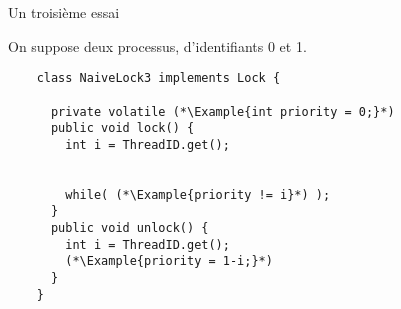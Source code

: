 
\begingroup

\begin{frame}[fragile]{Un troisième essai}

  \vspace{-15mm}
  On suppose deux processus, d'identifiants 0 et 1. 

  \begin{lstlisting}
    class NaiveLock3 implements Lock {

      private volatile (*\Example{int priority = 0;}*)
      public void lock() {
        int i = ThreadID.get();

        
        while( (*\Example{priority != i}*) );
      }
      public void unlock() {
        int i = ThreadID.get();
        (*\Example{priority = 1-i;}*)
      }
    }
  \end{lstlisting}

  
\end{frame}

\endgroup
\endinput
